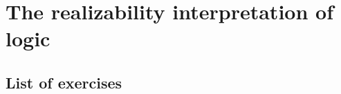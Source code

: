 \chapter{The realizability interpretation of logic}\label{chap:logic}

\section{List of exercises}

